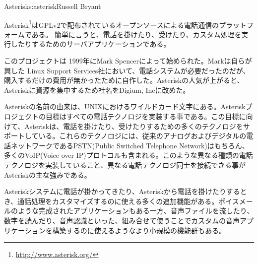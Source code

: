 \begin{aosachapter}{Asterisk}{s:asterisk}{Russell Bryant}

Asterisk\footnote{\url{http://www.asterisk.org/}}はGPLv2で配布されているオープンソースによる電話通信のプラットフォームである。
簡単に言うと、電話を掛けたり、受けたり、カスタム処理を実行したりするためのサーバアプリケーションである。

このプロジェクトは 1999年にMark Spencerによって始められた。Markは自らが興した Linux Support Services社において、電話システムが必要だったのだが、購入するだけの費用が無かったために自作した。Asteriskの人気が上がると、Asteriskに資源を集中するため社名をDigium, Incに改めた。

Asteriskの名前の由来は、UNIXにおけるワイルドカード文字\code{*}にある。Asteriskプロジェクトの目標はすべての電話テクノロジを実装する事である。この目標に向けて、Asteriskは、電話を掛けたり、受けたりするための多くのテクノロジをサポートしている。これらのテクノロジには、従来のアナログおよびデジタルの電話ネットワークであるPSTN(Public Switched Telephone Network)はもちろん、多くのVoIP(Voice over IP)プロトコルも含まれる。このような異なる種類の電話テクノロジを実装していること、異なる電話テクノロジ同士を接続できる事がAsteriskの主な強みである。

Asteriskシステムに電話が掛かってきたり、Asteriskから電話を掛けたりするとき、通話処理をカスタマイズするのに使える多くの追加機能がある。ボイスメールのような完成されたアプリケーションもある一方、音声ファイルを流したり、数字を読んだり、音声認識といった、組み合せて使うことでカスタムの音声アプリケーションを構築するのに使えるようなより小規模の機能群もある。


\end{aosachapter}

